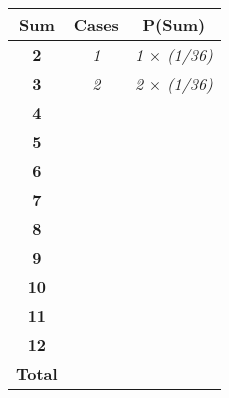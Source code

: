 \documentclass[convert]{standalone}
\begin{document}
    
\begin{tabular}{|c|c|c|}
\hline
\textbf{Sum}   & \textbf{Cases} & \textbf{P(Sum)} \\ \hline
\textbf{2}     & \textit{1}     & \textit{1 $\times$ (1/36)}     \\ \hline
\textbf{3}     & \textit{2}     & \textit{2 $\times$ (1/36)}     \\ \hline
\textbf{4}     &                &            \\ \hline
\textbf{5}     &                &            \\ \hline
\textbf{6}     &                &            \\ \hline
\textbf{7}     &                &            \\ \hline
\textbf{8}     &                &            \\ \hline
\textbf{9}     &                &            \\ \hline
\textbf{10}    &                &            \\ \hline
\textbf{11}    &                &            \\ \hline
\textbf{12}    &                &            \\ \hline
\textbf{Total} &                &            \\ \hline
\end{tabular}
\end{document}
